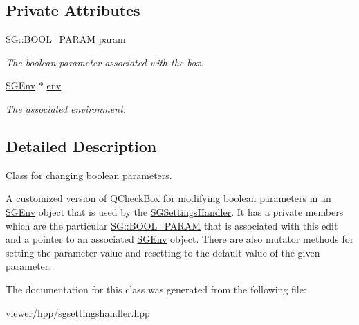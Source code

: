 \subsection*{Private Attributes}
\begin{DoxyCompactItemize}
\item 
\mbox{\label{classSGBoolParamBox_a490e196a9b5942edf920d16a83ff9a98}} 
\hyperlink{namespaceSG_a0b164afe6c58be3386d9e3f6e857b673}{S\+G\+::\+B\+O\+O\+L\+\_\+\+P\+A\+R\+AM} \hyperlink{classSGBoolParamBox_a490e196a9b5942edf920d16a83ff9a98}{param}
\begin{DoxyCompactList}\small\item\em The boolean parameter associated with the box. \end{DoxyCompactList}\item 
\mbox{\label{classSGBoolParamBox_aa3592842bf61b151242c99cf8bc3517a}} 
\hyperlink{classSGEnv}{S\+G\+Env} $\ast$ \hyperlink{classSGBoolParamBox_aa3592842bf61b151242c99cf8bc3517a}{env}
\begin{DoxyCompactList}\small\item\em The associated environment. \end{DoxyCompactList}\end{DoxyCompactItemize}


\subsection{Detailed Description}
Class for changing boolean parameters. 

A customized version of Q\+Check\+Box for modifying boolean parameters in an \hyperlink{classSGEnv}{S\+G\+Env} object that is used by the \hyperlink{classSGSettingsHandler}{S\+G\+Settings\+Handler}. It has a private members which are the particular \hyperlink{namespaceSG_a0b164afe6c58be3386d9e3f6e857b673}{S\+G\+::\+B\+O\+O\+L\+\_\+\+P\+A\+R\+AM} that is associated with this edit and a pointer to an associated \hyperlink{classSGEnv}{S\+G\+Env} object. There are also mutator methods for setting the parameter value and resetting to the default value of the given parameter. 

The documentation for this class was generated from the following file\+:\begin{DoxyCompactItemize}
\item 
viewer/hpp/sgsettingshandler.\+hpp\end{DoxyCompactItemize}
